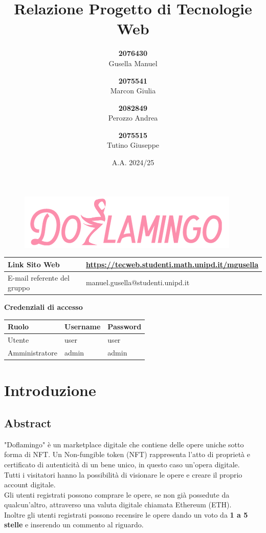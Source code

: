 \documentclass[10pt]{article}
\title{Relazione Progetto di Tecnologie Web}
\author{
    \textbf{2076430}\\ Gusella Manuel \and
    \textbf{2075541}\\ Marcon Giulia \and
    \textbf{2082849}\\ Perozzo Andrea \and
    \textbf{2075515}\\ Tutino Giuseppe
}
\date{A.A. 2024/25}
\begin{document}
\begin{figure}
    \centering
    \includegraphics[width=0.5\linewidth]{logo.png}
\end{figure}
\maketitle
\renewcommand{\arraystretch}{2}
\begin{tabular}{|>{\centering\arraybackslash}m{7cm}|>{\centering\arraybackslash}m{8cm}|}
    \hline
     Link Sito Web & \small{\url{https://tecweb.studenti.math.unipd.it/mgusella}} \\
     \hline
     E-mail referente del gruppo & manuel.gusella@studenti.unipd.it \\
    \hline
\end{tabular}

\vspace{0.5cm} 
\begin{center}
    \textbf{\Large Credenziali di accesso}
\end{center}
\vspace{0.5cm} 
\begin{tabularx}{\textwidth}{|>{\centering\arraybackslash}X|>{\centering\arraybackslash}X|>{\centering\arraybackslash}X|}
    \hline
    Ruolo & Username & Password \\
    \hline
    Utente & user & user \\
    \hline
    Amministratore & admin & admin \\
    \hline
\end{tabularx}

\newpage
\tableofcontents
\newpage

\section{Introduzione}
\subsection{Abstract}
"Doflamingo" è un marketplace digitale che contiene delle opere uniche sotto forma di NFT.
Un Non-fungible token (NFT) rappresenta l'atto di proprietà e certificato di autenticità di un bene unico, in questo caso un'opera digitale. \\
Tutti i visitatori hanno la possibilità di visionare le opere e creare il proprio account digitale.\\
Gli utenti registrati possono comprare le opere, se non già possedute da qualcun'altro, attraverso una valuta digitale chiamata Ethereum (ETH). \\
Inoltre gli utenti registrati possono recensire le opere dando un voto da \textbf{1 a 5 stelle} e inserendo un commento al riguardo.\\
\end{document}
